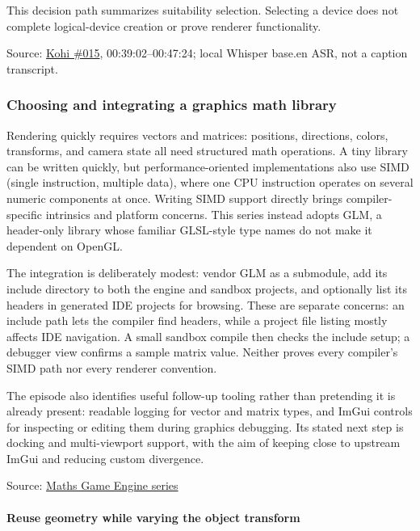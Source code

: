 This decision path summarizes suitability selection. Selecting a device does not complete logical-device creation or prove renderer functionality.

Source: \href{https://www.youtube.com/watch?v=6Kj3O2Ov1RU}{Kohi \#015}, 00:39:02--00:47:24; local Whisper base.en ASR, not a caption transcript.

\subsubsection{Choosing and integrating a graphics math library}\label{choosing-and-integrating-a-graphics-math-library}

Rendering quickly requires vectors and matrices: positions, directions, colors, transforms, and camera state all need structured math operations. A tiny library can be written quickly, but performance-oriented implementations also use SIMD (single instruction, multiple data), where one CPU instruction operates on several numeric components at once. Writing SIMD support directly brings compiler-specific intrinsics and platform concerns. This series instead adopts GLM, a header-only library whose familiar GLSL-style type names do not make it dependent on OpenGL.

The integration is deliberately modest: vendor GLM as a submodule, add its include directory to both the engine and sandbox projects, and optionally list its headers in generated IDE projects for browsing. These are separate concerns: an include path lets the compiler find headers, while a project file listing mostly affects IDE navigation. A small sandbox compile then checks the include setup; a debugger view confirms a sample matrix value. Neither proves every compiler's SIMD path nor every renderer convention.

The episode also identifies useful follow-up tooling rather than pretending it is already present: readable logging for vector and matrix types, and ImGui controls for inspecting or editing them during graphics debugging. Its stated next step is docking and multi-viewport support, with the aim of keeping close to upstream ImGui and reducing custom divergence.

Source: \href{https://www.youtube.com/watch?v=Idr1G1KyPNg}{Maths \textbar{} Game Engine series}

\paragraph{Reuse geometry while varying the object transform}\label{reuse-geometry-while-varying-the-object-transform}

